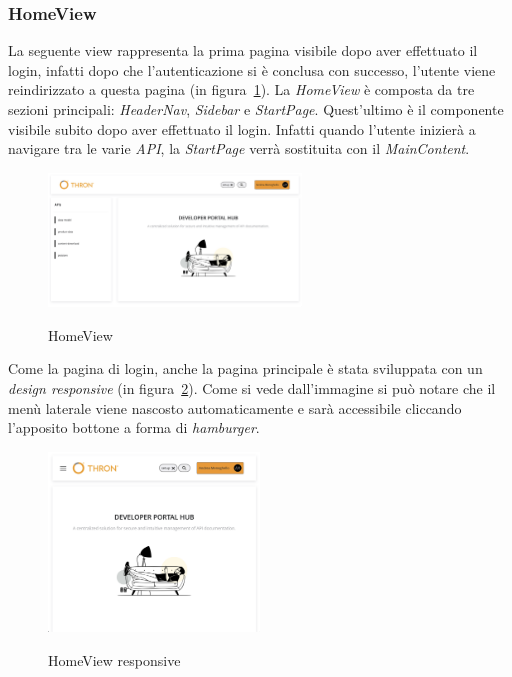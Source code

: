 \subsubsection{HomeView}\label{subsubsec:home-view}
La seguente view rappresenta la prima pagina visibile dopo aver effettuato il login, infatti dopo che l'autenticazione si è conclusa con successo, 
l'utente viene reindirizzato a questa pagina (in figura~\ref{fig:home-view}).
La \textit{HomeView} è composta da tre sezioni principali: \textit{HeaderNav}, \textit{Sidebar} e \textit{StartPage}. Quest'ultimo è il componente visibile 
subito dopo aver effettuato il login. Infatti quando l'utente inizierà a navigare tra le varie \textit{API}, la \textit{StartPage} verrà sostituita con il \textit{MainContent}.

\begin{figure}[ht]
  \centering
  \includegraphics[width=0.6\textwidth, alt={Pagina principale dell'applicazione}]{images/frontend/HomeView.jpg}
  \caption{HomeView}\label{fig:home-view}
\end{figure}
\pagebreak

Come la pagina di login, anche la pagina principale è stata sviluppata con un \textit{design responsive} (in figura~\ref{fig:home-view-responsive}).
Come si vede dall'immagine si può notare che il menù laterale viene nascosto automaticamente e sarà accessibile cliccando l'apposito bottone a forma di \textit{hamburger}.

\begin{figure}[ht]
  \centering
  \includegraphics[width=0.5\textwidth, alt={Pagina principale responsive dell'applicazione}]{images/frontend/HomeViewRes.jpg}
  \caption{HomeView responsive}\label{fig:home-view-responsive}
\end{figure}


